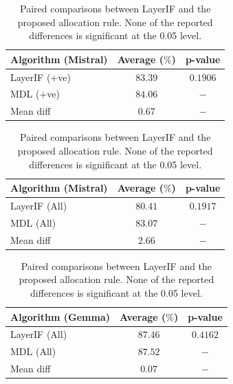 \documentclass[accepted]{uai2026}%
\theoremstyle{remark}%
\begin{document}
\begin{table}[htbp]

        \caption{Paired comparisons between LayerIF and the proposed allocation rule. None of the reported differences is significant at the 0.05 level.}
    \begin{minipage}{0.48\textwidth}
        \centering
        \label{tab:mistral-p-value-posIF}
        \begin{tabular}{lcc}
        \toprule
        Algorithm (Mistral) & Average ($\%$) & p-value \\
        \midrule
        LayerIF (+ve) & $83.39$ & $0.1906$ \\
        MDL (+ve) & $84.06$ & $-$ \\
        \midrule
        Mean diff & $0.67$ & $-$\\
        \bottomrule
        \end{tabular}
    \end{minipage}\hfill
    \begin{minipage}{0.48\textwidth}
        \centering
        \label{tab:mistral-p-value-allIF}
        \begin{tabular}{lcc}
        \toprule
        Algorithm (Mistral) & Average ($\%$) & p-value \\
        \midrule
        LayerIF (All) & $80.41$ & $0.1917$ \\
        MDL (All) & $83.07$ & $-$ \\
        \midrule
        Mean diff & $2.66$ & $-$ \\
        \bottomrule
        \end{tabular}
    \end{minipage}

    \vspace{1.3em}

    {\centering
    \begin{minipage}{0.48\textwidth}
        \centering
        \begin{tabular}{lcc}
        \toprule
        Algorithm (Gemma) & Average ($\%$) & p-value \\
        \midrule
        LayerIF (All) & $87.46$ & $0.4162$ \\
        MDL (All) & $87.52$ & $-$ \\
        \midrule
        Mean diff & $0.07$ & $-$ \\
        \bottomrule
        \end{tabular}
    \end{minipage}\par}
\end{table}
\end{document}
